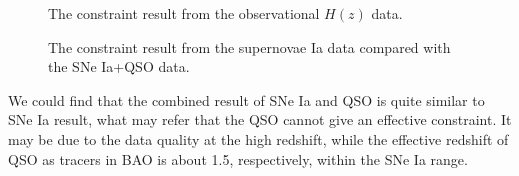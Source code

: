 \documentclass[twocolumn]{aastex631}
\begin{document}
   \begin{figure}[htbp]
      \centering
      \caption{The constraint result from the observational
      $H(z)$ data.}
      \label{fig:1}
   \end{figure}

   \begin{figure}[htbp]
      \centering
      \caption{The constraint result from the supernovae Ia data
      compared with the SNe Ia+QSO data.}
   \end{figure}

   We could find that the combined result of SNe Ia and QSO is quite
   similar to SNe Ia result, what may refer that the QSO cannot
   give an effective constraint. It may be due to the data quality
   at the high redshift, while the effective redshift of QSO as tracers in BAO
   is about 1.5, respectively, within the SNe Ia range.
\end{document}
